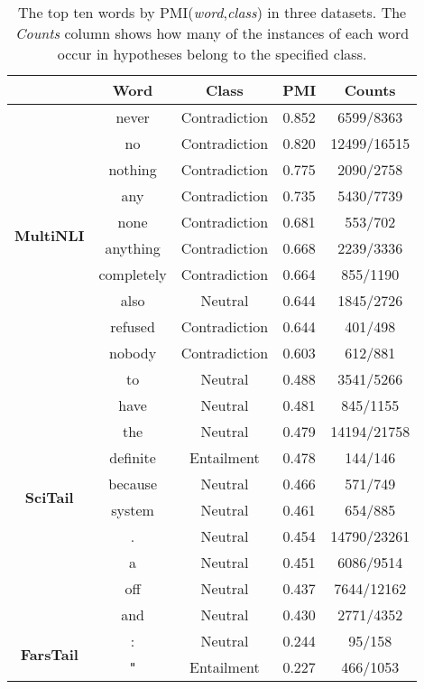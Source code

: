 \documentclass[preprint,12pt]{elsarticle}
\begin{document}
\begin{table}[p]
    \centering
    \caption{The top ten words by PMI(\textit{word},\textit{class}) in three datasets. The \textit{Counts} column shows how many of the instances of each word occur in hypotheses belong to the specified class.}
    \label{tab:pmi}
    \begin{tabular}{c c c c c}
        \Xhline{2\arrayrulewidth}
& \textbf{Word} & \textbf{Class} & \textbf{PMI} & \textbf{Counts}\\
        \hline
        \multirow{10}{*}{\textbf{MultiNLI}} & never & Contradiction & 0.852 & 6599/8363\\
          & no & Contradiction&0.820 &12499/16515\\
          & nothing&Contradiction &0.775 &2090/2758\\
          & any&Contradiction &0.735 &5430/7739\\
          & none&Contradiction &0.681 &553/702\\
          & anything & Contradiction & 0.668 & 2239/3336\\
          & completely & Contradiction & 0.664 & 855/1190\\
          & also & Neutral & 0.644 & 1845/2726\\
          & refused & Contradiction & 0.644 & 401/498\\
          & nobody & Contradiction & 0.603 & 612/881\\
        \hline
        \multirow{10}{*}{\textbf{SciTail}} & to & Neutral & 0.488 & 3541/5266\\
        & have & Neutral & 0.481 & 845/1155\\
        & the & Neutral & 0.479 & 14194/21758\\
        & definite & Entailment & 0.478 & 144/146 \\
        & because & Neutral & 0.466 & 571/749\\
        & system & Neutral & 0.461 & 654/885\\
        & . & Neutral & 0.454 & 14790/23261\\
        & a & Neutral & 0.451 & 6086/9514\\
        & off & Neutral & 0.437 & 7644/12162\\
        & and & Neutral & 0.430 & 2771/4352\\
        \hline
        \multirow{10}{*}{\textbf{FarsTail}} & : & Neutral & 0.244 & 95/158\\
        & \texttt{"} & Entailment & 0.227 & 466/1053\\

\end{tabular}
\end{table}
\end{document}
